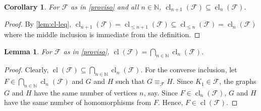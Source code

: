\documentclass[10pt,a4paper]{article}
\theoremstyle{definition}
\theoremstyle{plain}
\newtheorem{lemma}[definition]{Lemma}
\newtheorem{corollary}[definition]{Corollary}
\theoremstyle{remark}
\DeclareMathOperator{\cl}{cl}
\begin{document}
	\begin{corollary}
		For $\mathcal{F}$ as in \cref{proviso} and all $n \in \mathbb{N}$,
		$\cl_{n+1}(\mathcal{F}) \subseteq \cl_n(\mathcal{F})$.
	\end{corollary}
	\begin{proof}
		By \cref{lem:cl-leq},
		$\cl_{n+1}(\mathcal{F}) = \cl_{\leq n+1}(\mathcal{F}) \subseteq \cl_{\leq n}(\mathcal{F}) = \cl_n(\mathcal{F})$
		where the middle inclusion is immediate from the definition.
	\end{proof}
	
	
	\begin{lemma}
		For $\mathcal{F}$ as in \cref{proviso},
		$\cl(\mathcal{F}) = \bigcap_{n \in \mathbb{N}} \cl_n(\mathcal{F})$. 
	\end{lemma}
	\begin{proof}
		Clearly, $\cl(\mathcal{F}) \subseteq \bigcap_{n \in \mathbb{N}} \cl_n(\mathcal{F})$.
		For the converse inclusion,
		let $F \in \bigcap_{n \in \mathbb{N}} \cl_n(\mathcal{F})$ and $G$ and $H$ such that $G \equiv_{\mathcal{F}} H$.
		Since $K_1 \in \mathcal{F}$,
		the graphs $G$ and $H$ have the same number of vertices $n$, say.
		Since $F \in  \cl_n(\mathcal{F})$,
		$G$ and $H$ have the same number of homomorphisms from $F$.
		Hence, $F \in \cl(\mathcal{F})$. 
	\end{proof}
	
	
\end{document}
